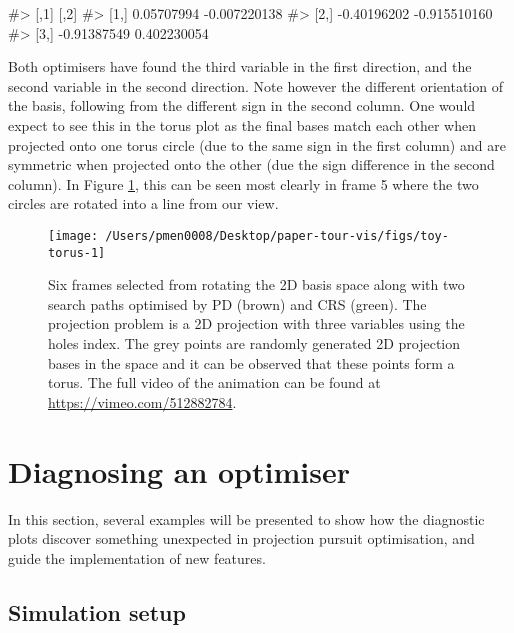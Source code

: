 \begin{Schunk}
\begin{Soutput}
#>             [,1]         [,2]
#> [1,]  0.05707994 -0.007220138
#> [2,] -0.40196202 -0.915510160
#> [3,] -0.91387549  0.402230054
\end{Soutput}
\end{Schunk}

Both optimisers have found the third variable in the first direction,
and the second variable in the second direction. Note however the
different orientation of the basis, following from the different sign in
the second column. One would expect to see this in the torus plot as the
final bases match each other when projected onto one torus circle (due
to the same sign in the first column) and are symmetric when projected
onto the other (due the sign difference in the second column). In Figure
\ref{fig:toy-torus}, this can be seen most clearly in frame 5 where the
two circles are rotated into a line from our view.

\begin{Schunk}
\begin{figure}

{\centering \texttt{[image: /Users/pmen0008/Desktop/paper-tour-vis/figs/toy-torus-1]} 

}

\caption{Six frames selected from rotating the 2D basis space along with two search paths optimised by PD (brown) and CRS (green). The projection problem is a 2D projection with three variables using the holes index. The grey points are randomly generated 2D projection bases in the space and it can be observed that these points form a torus. The full video of the animation can be found at \url{https://vimeo.com/512882784}.}\label{fig:toy-torus}
\end{figure}
\end{Schunk}

\hypertarget{application}{%
\section{Diagnosing an optimiser}\label{application}}

In this section, several examples will be presented to show how the
diagnostic plots discover something unexpected in projection pursuit
optimisation, and guide the implementation of new features.

\hypertarget{simulation-setup}{%
\subsection{Simulation setup}\label{simulation-setup}}

